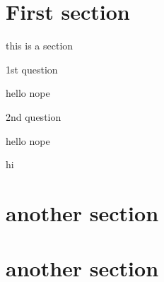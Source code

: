 \documentclass[noquestionbreak, customfontpath=../../Fonts/]{../../skrexam}  %
\begin{document}
\pagestyle{headandfoot}
\runningheader{}{\resizebox{\textwidth}{!}{\HeaderDescription}}{}

\runningheadrule


\section{First section}\noindent

this is a section


\begin{questions}
	\question
	1st question
	\begin{choices}
	\choice hello
	\choice nope
	\end{choices}
	
	\question 2nd question
	\begin{choices}
	\choice hello
	\choice nope
	\end{choices}
\end{questions}


hi

\section{another section}
\newpage

\section{another section}

\setcounter{totalpages}{\value{page}}
\setcounter{totalsections}{\value{section}}
\end{document}
